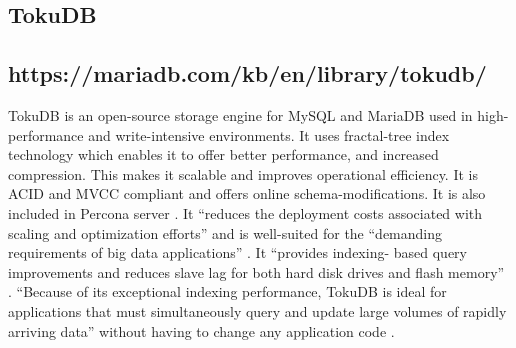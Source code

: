 \subsection{TokuDB}
\subsection{https://mariadb.com/kb/en/library/tokudb/}
 
TokuDB is an open-source storage engine for MySQL and MariaDB used in high-
performance and write-intensive environments. It uses fractal-tree index 
technology which enables it to offer better performance, and increased compression. 
This makes it scalable and improves operational efficiency. It is ACID and MVCC 
compliant and offers online schema-modifications. It is also included in Percona 
server \cite{www-wikipedia}. It “reduces the deployment costs associated with 
scaling and optimization efforts” and is well-suited for the “demanding 
requirements of big data applications” \cite{www-percona}. It “provides indexing-
based query improvements and reduces slave lag for both hard disk drives and flash 
memory” \cite{www-wikipedia}. “Because of its exceptional indexing performance, 
TokuDB is ideal for applications that must simultaneously query and update large 
volumes of rapidly arriving data” without having to change any application code 
\cite{blackbird-si}.


